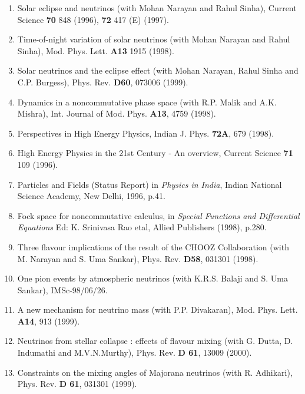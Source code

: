 \begin{enumerate}
\item Solar eclipse and neutrinos (with Mohan Narayan and Rahul Sinha),
Current Science {\bf 70} 848 (1996), {\bf 72} 417 (E) (1997).

\item Time-of-night variation of solar neutrinos (with Mohan Narayan and
Rahul Sinha), Mod. Phys. Lett. {\bf A13} 1915 (1998).

\item Solar neutrinos and the eclipse effect (with Mohan Narayan,  Rahul
Sinha and C.P. Burgess), Phys. Rev. {\bf D60}, 073006 (1999).

\item Dynamics in a noncommutative phase space (with R.P. Malik and A.K.
Mishra), Int. Journal of Mod. Phys. {\bf A13}, 4759 (1998).

\item Perspectives in High Energy Physics, Indian J. Phys. {\bf 72A},
679 (1998).

\item High Energy Physics in the 21st Century - An overview, Current
Science {\bf 71} 109 (1996).

\item Particles and Fields (Status Report) in {\it {Physics in
India}}, Indian National Science Academy, New Delhi, 1996, p.41.

\item Fock space for noncommutative calculus, in {\it Special Functions
and Differential Equations} Ed: K. Srinivasa Rao etal, Allied Publishers
(1998), p.280.

\item Three flavour implications of the result of the CHOOZ
Collaboration (with M. Narayan and S. Uma Sankar), Phys. Rev. {\bf D58},
031301 (1998).

\item One pion events by atmospheric neutrinos (with K.R.S. Balaji and
S. Uma Sankar), IMSc-98/06/26.

\item A new mechanism for neutrino mass (with P.P. Divakaran), Mod.
Phys. Lett. {\bf A14}, 913 (1999).

\item Neutrinos from stellar collapse : effects of flavour mixing (with
G. Dutta, D. Indumathi and M.V.N.Murthy), Phys. Rev. {\bf D 61}, 13009
(2000).

\item Constraints on the mixing angles of Majorana neutrinos (with R.
Adhikari), Phys. Rev. {\bf D 61}, 031301 (1999). 


\end{enumerate}
